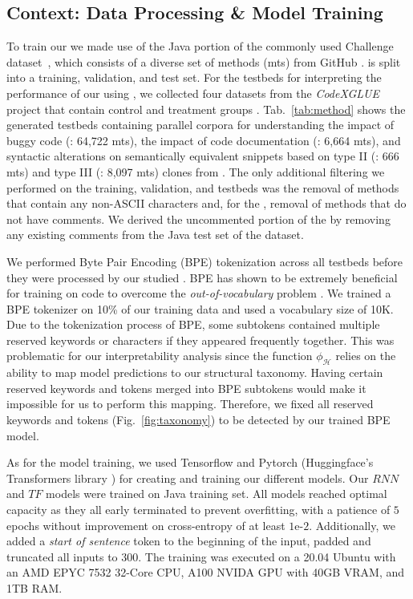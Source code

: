 \subsection{Context: Data Processing \& Model Training}
To train our \nlms we made use of the Java portion of the commonly used \training Challenge dataset~\citep{husain2019codesearchnet}, which consists of a diverse set of methods (mts) from GitHub \citep{github}. \training is split into a training, validation, and test set. For the testbeds for interpreting the performance of our \nlms using \codegen, we collected four datasets from the \textit{CodeXGLUE} project that contain control and treatment groups \citep{DBLP:journals/corr/abs-2102-04664}. Tab.~\ref{tab:method} shows the generated testbeds containing parallel corpora for understanding the impact of buggy code (\BuggyTB: 64,722 mts), the impact of code documentation (\CommentsTB: 6,664 mts), and syntactic alterations on semantically equivalent snippets based on type II (\BigCloneIITB: 666 mts) and type III (\BigCloneIIITB: 8,097 mts) clones from \BigCloneTB. The only additional filtering we performed on the training, validation, and testbeds was the removal of methods that contain any non-ASCII characters and, for the \CommentsTB, removal of methods that do not have comments.  We derived the uncommented portion of the \CommentsTB by removing any existing comments from the Java test set of the \training dataset.

We performed Byte Pair Encoding (BPE) tokenization \citep{sennrich2015neural} across all testbeds before they were processed by our studied \nlms. BPE has shown to be extremely beneficial for training \nlms on code to overcome the \textit{out-of-vocabulary} problem \citep{Karampatsis2020BigCode}. We trained a BPE tokenizer on 10\% of our training data and used a vocabulary size of 10K. Due to the tokenization process of BPE, some subtokens contained multiple reserved keywords or characters if they appeared frequently together. This was problematic for our interpretability analysis since the function $\phi_{\mathcal{H}}$ relies on the ability to map model predictions to our structural taxonomy. Having certain reserved keywords and tokens merged into BPE subtokens would make it impossible for us to perform this mapping. Therefore, we fixed all reserved keywords and tokens (Fig.~\ref{fig:taxonomy}) to be detected by our trained BPE model.

As for the model training, we used Tensorflow and Pytorch \citep{tensorflow2015-whitepaper, pytorch} (Huggingface's Transformers library \citep{wolf2020transformers}) for creating and training our different models. Our $RNN$ and $TF$ models were trained on \training Java training set. All models reached optimal capacity as they all early terminated to prevent overfitting, with a patience of $5$ epochs without improvement on cross-entropy of at least $1\text{e-2}$. Additionally, we added a \textit{start of sentence} token to the beginning of the input, padded and truncated all inputs to $300$. The training was executed on a 20.04 Ubuntu with an AMD EPYC 7532 32-Core CPU, A100 NVIDA GPU with 40GB VRAM, and 1TB RAM.

